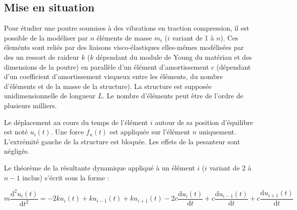 \documentclass[10pt,fleqn]{article} %
\begin{document}

\vspace{10cm}
\pagestyle{fancy}
\thispagestyle{plain}


\def\columnseprulecolor{\color{ocre}}
\setlength{\columnseprule}{0.4pt} 
\begin{multicols}{2}

\section*{Mise en situation}

Pour étudier une poutre soumises à des vibrations en traction compression, il est possible de la modéliser par $n$ éléments de masse $m_i$ ($i$ variant de 1 à $n$). Ces éleménts sont reliés par des liaisons visco-élastiques elles-mêmes modélisées par des un ressort de raideur $k$ ($k$ dépendant du module de Young du matériau et des dimensions de la poutre) en parallèle d'un élément d'amortissement $c$ (dépendant d'un coefficient d'amortissement visqueux entre les éléments, du nombre d'éléments et de la masse de la structure). La structure est supposée unidimensionnelle de longueur $L$. Le nombre d'éléments peut être de l'ordre de plusieurs milliers. 

Le déplacement au cours du temps de l'élément $i$ autour de sa position d'équilibre est noté $u_i(t)$. Une force $f_n(t)$ est appliquée sur l'élément $n$ uniquement. L'extrémité gauche de
la structure est bloquée. Les effets de la pesanteur sont négligés.
\begin{center}
\end{center}



Le théorème de la résultante dynamique appliqué à un élément $i$ ($i$ variant de 2 à $n-1$ inclus) s'écrit sous la forme : 



\begin{equation}
m\dfrac{\text{d}^2u_i(t)}{\text{d}t^2} = 
- 2 k u_i(t)  + k u_{i-1}(t) + k u_{i+1}(t)
- 2c \dfrac{\text{d}u_i(t)}{\text{d}t}   +c \dfrac{\text{d}u_{i-1}(t)}{\text{d}t} +c \dfrac{\text{d}u_{i+1}(t)}{\text{d}t}
\end{equation}


\end{multicols}
\end{document}
